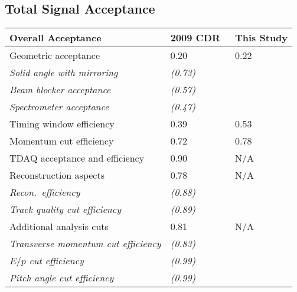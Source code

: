 \subsection{Total Signal Acceptance}
\begin{table}[tb]
	\centering
\begin{tabular}{lll}%
\bf{Overall Acceptance}                                & 2009 CDR~\cite{CDRphase2} & This Study \\ 
\hline
Geometric acceptance                                   & 0.20                      & 0.22       \\ 
\hspace{1ex} \emph{Solid angle with mirroring}         & \emph{(0.73)}             &            \\ 
\hspace{1ex} \emph{Beam blocker acceptance}            & \emph{(0.57)}             &            \\ 
\hspace{1ex} \emph{Spectrometer acceptance}            & \emph{(0.47)}             &            \\ 
Timing window efficiency                               & 0.39                      & 0.53       \\ 
Momentum cut efficiency                                & 0.72                      & 0.78       \\ 
\hline
TDAQ acceptance and efficiency                         & 0.90                      & N/A        \\ 
Reconstruction aspects                                 & 0.78                      & N/A        \\ 
\hspace{1ex} \emph{Recon.~efficiency}                  & \emph{(0.88)}             &            \\ 
\hspace{1ex} \emph{Track quality cut efficiency}       & \emph{(0.89)}             &            \\ 
Additional analysis cuts                               & 0.81                      & N/A        \\ 
\hspace{1ex} \emph{Transverse momentum cut efficiency} & \emph{(0.83)}             &            \\ 
\hspace{1ex} \emph{$E/p$ cut efficiency}               & \emph{(0.99)}             &            \\ 
\hspace{1ex} \emph{Pitch angle cut efficiency}         & \emph{(0.99)}             &            \\ 

\end{tabular}
\end{table}

